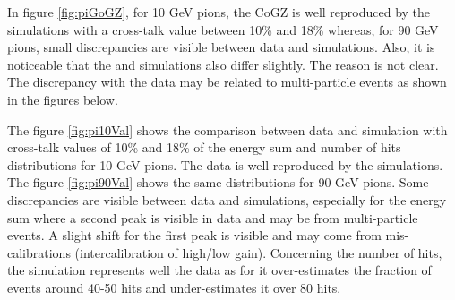 In figure \ref{fig:piGoGZ}, for 10 GeV pions, the CoGZ is well reproduced by the simulations with a cross-talk value between 10\% and 18\% whereas, for 90 GeV pions, small discrepancies are visible between data and simulations. Also, it is noticeable that the \ddhep and \mokka simulations also differ slightly. The reason is not clear. The discrepancy with the data may be related to multi-particle events as shown in the figures below.

The figure \ref{fig:pi10Val} shows the comparison between data and simulation with cross-talk values of 10\% and 18\% of the energy sum and number of hits distributions for 10 GeV pions. The data is well reproduced by the simulations. The figure \ref{fig:pi90Val} shows the same distributions for 90 GeV pions. Some discrepancies are visible between data and simulations, especially for the energy sum where a second peak is visible in data and may be from multi-particle events. A slight shift for the first peak is visible and may come from mis-calibrations (intercalibration of high/low gain). Concerning the number of hits, the \mokka simulation represents well the data as for \ddhep it over-estimates the fraction of events around 40-50 hits and under-estimates it over 80 hits.

